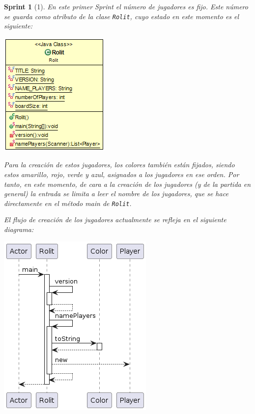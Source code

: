 \documentclass{article}
\theoremstyle{break}
\newtheorem*{sprint}{Sprint}
\begin{document}
\begin{sprint}[1]
En este primer Sprint el número de jugadores es fijo. Este número se guarda como atributo de la clase \texttt{Rolit}, cuyo estado en este momento es el siguiente:

\begin{center}
\includegraphics[scale=0.85]{Rolit-sprint1.png} 
\end{center}

Para la creación de estos jugadores, los colores también están fijados, siendo estos amarillo, rojo, verde y azul, asignados a los jugadores en ese orden. Por tanto, en este momento, de cara a la creación de los jugadores (y de la partida en general) la entrada se limita a leer el nombre de los jugadores, que se hace directamente en el método main de \texttt{Rolit}.

El flujo de creación de los jugadores actualmente se refleja en el siguiente diagrama:

\begin{center}
\includegraphics[scale=0.85]{Rolit.main()-sprint1.png} 
\end{center}

\end{sprint}
\end{document}
